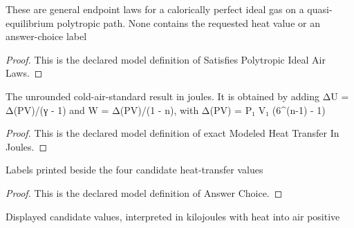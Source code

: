 \begin{definition}
  \label{def:physics:phyx-mini-0460:phyxminiproblems-problemphyxmini0460-satisfiespolytropicidealairlaws}
  These are general endpoint laws for a calorically perfect ideal gas on a quasi-equilibrium polytropic path. None contains the requested heat value or an answer-choice label
\end{definition}
\begin{proof}
  This is the declared model definition of Satisfies Polytropic Ideal Air Laws.
\end{proof}
\begin{definition}
  \label{def:physics:phyx-mini-0460:phyxminiproblems-problemphyxmini0460-exactmodeledheattransferinjoules}
  The unrounded cold-air-standard result in joules. It is obtained by adding ΔU = Δ(PV)/(γ - 1) and W = Δ(PV)/(1 - n), with Δ(PV) = P₁ V₁ (6\textasciicircum{}(n-1) - 1)
\end{definition}
\begin{proof}
  This is the declared model definition of exact Modeled Heat Transfer In Joules.
\end{proof}
\begin{definition}
  \label{def:physics:phyx-mini-0460:phyxminiproblems-problemphyxmini0460-answerchoice}
  Labels printed beside the four candidate heat-transfer values
\end{definition}
\begin{proof}
  This is the declared model definition of Answer Choice.
\end{proof}
\begin{definition}
  \label{def:physics:phyx-mini-0460:phyxminiproblems-problemphyxmini0460-displayedheattransferinkilojoules}
  Displayed candidate values, interpreted in kilojoules with heat into air positive
\end{definition}
